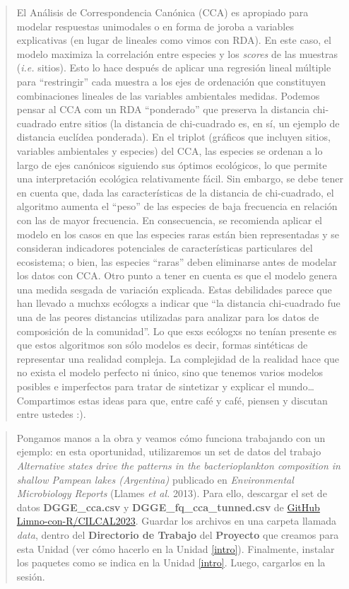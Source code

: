 \documentclass[
]{book}
\begin{document}
\begin{quote}
El Análisis de Correspondencia Canónica (CCA) es apropiado para modelar respuestas unimodales o en forma de joroba a variables explicativas (en lugar de lineales como vimos con RDA). En este caso, el modelo maximiza la correlación entre especies y los \emph{scores} de las muestras (\emph{i.e.} sitios). Esto lo hace después de aplicar una regresión lineal múltiple para ``restringir'' cada muestra a los ejes de ordenación que constituyen combinaciones lineales de las variables ambientales medidas.
Podemos pensar al CCA com un RDA ``ponderado'' que preserva la distancia chi-cuadrado entre sitios (la distancia de chi-cuadrado es, en sí, un ejemplo de distancia euclídea ponderada). En el triplot (gráficos que incluyen sitios, variables ambientales y especies) del CCA, las especies se ordenan a lo largo de ejes canónicos siguiendo sus óptimos ecológicos, lo que permite una interpretación ecológica relativamente fácil. Sin embargo, se debe tener en cuenta que, dada las características de la distancia de chi-cuadrado, el algoritmo aumenta el ``peso'' de las especies de baja frecuencia en relación con las de mayor frecuencia. En consecuencia, se recomienda aplicar el modelo en los casos en que las especies raras están bien representadas y se consideran indicadores potenciales de características particulares del ecosistema; o bien, las especies ``raras'' deben eliminarse antes de modelar los datos con CCA. Otro punto a tener en cuenta es que el modelo genera una medida sesgada de variación explicada. Estas debilidades parece que han llevado a muchxs ecólogxs a indicar que ``la distancia chi-cuadrado fue una de las peores distancias utilizadas para analizar para los datos de composición de la comunidad''. Lo que esxs ecólogxs no tenían presente es que estos algoritmos son sólo modelos es decir, formas sintéticas de representar una realidad compleja. La complejidad de la realidad hace que no exista el modelo perfecto ni único, sino que tenemos varios modelos posibles e imperfectos para tratar de sintetizar y explicar el mundo\ldots{} Compartimos estas ideas para que, entre café y café, piensen y discutan entre ustedes :).
\end{quote}

\begin{quote}
Pongamos manos a la obra y veamos cómo funciona trabajando con un ejemplo: en esta oportunidad, utilizaremos un set de datos del trabajo \emph{Alternative states drive the patterns in the bacterioplankton composition in shallow Pampean lakes (Argentina)} publicado en \emph{Environmental Microbiology Reports} (Llames \emph{et al.} 2013). Para ello, descargar el set de datos \textbf{DGGE\_cca.csv} y \textbf{DGGE\_fq\_cca\_tunned.csv} de \href{https://github.com/Limno-con-R/CILCAL2023/tree/main/datasets}{GitHub Limno-con-R/CILCAL2023}.
Guardar los archivos en una carpeta llamada \emph{data}, dentro del \textbf{Directorio de Trabajo} del \textbf{Proyecto} que creamos para esta Unidad (ver cómo hacerlo en la Unidad \ref{intro}). Finalmente, instalar los paquetes como se indica en la Unidad \ref{intro}. Luego, cargarlos en la sesión.
\end{quote}
\end{document}
